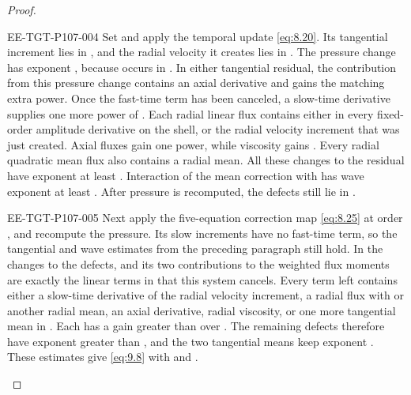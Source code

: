 \begin{proof}
\begin{EESegment}{EE-TGT-P107-004}
Set  and apply the temporal update \eqref{eq:8.20}. Its
tangential increment lies in , and the radial velocity it
creates lies in . The pressure change has exponent
, because  occurs in
. In either tangential residual, the contribution from this pressure
change contains an axial derivative and gains the matching extra power. Once the fast-time term has
been canceled, a slow-time derivative supplies one more power of
. Each radial linear flux contains either
 in every fixed-order amplitude derivative on the shell, or
the radial velocity increment that was just created. Axial fluxes gain one power, while viscosity
gains . Every radial quadratic mean flux also contains a radial
mean. All these changes to the residual have exponent at least
. Interaction of the mean correction with
 has wave exponent at least
. After pressure is recomputed, the defects still lie in
.
\end{EESegment}

\begin{EESegment}{EE-TGT-P107-005}
Next apply the five-equation correction map \eqref{eq:8.25} at order
, and recompute the pressure. Its slow increments have no fast-time term,
so the tangential and wave estimates from the preceding paragraph still hold. In the changes to the
defects,  and its two contributions to the weighted flux moments
are exactly the linear terms in
 that this system
cancels. Every term left contains either a slow-time derivative of the radial velocity increment, a
radial flux with  or another radial mean, an axial derivative, radial
viscosity, or one more tangential mean in
. Each has a gain greater than
 over . The remaining defects therefore have
exponent greater than , and the two tangential means keep
exponent . These estimates give \eqref{eq:9.8} with
 and .
\end{EESegment}


\end{proof}
